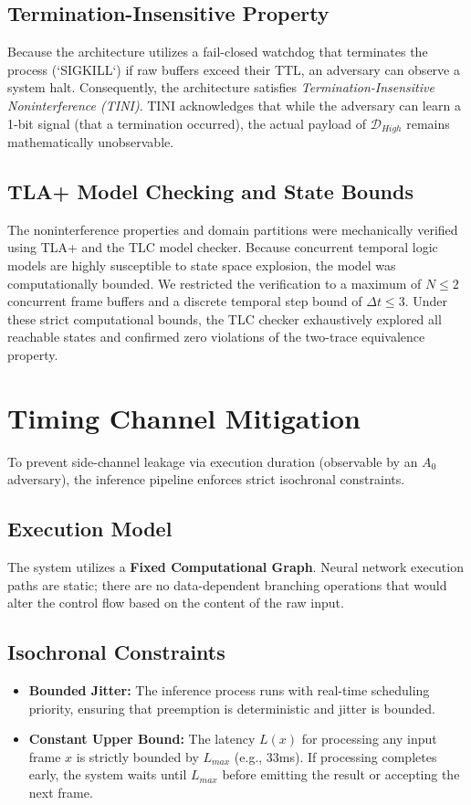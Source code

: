 \documentclass[conference]{IEEEtran}
\begin{document}
\subsection{Termination-Insensitive Property}
Because the architecture utilizes a fail-closed watchdog that terminates the process (`SIGKILL`) if raw buffers exceed their TTL, an adversary can observe a system halt. Consequently, the architecture satisfies \textit{Termination-Insensitive Noninterference (TINI)}. TINI acknowledges that while the adversary can learn a 1-bit signal (that a termination occurred), the actual payload of $\mathcal{D}_{High}$ remains mathematically unobservable.

\subsection{TLA+ Model Checking and State Bounds}
The noninterference properties and domain partitions were mechanically verified using TLA+ and the TLC model checker. Because concurrent temporal logic models are highly susceptible to state space explosion, the model was computationally bounded. We restricted the verification to a maximum of $N \le 2$ concurrent frame buffers and a discrete temporal step bound of $\Delta t \le 3$. Under these strict computational bounds, the TLC checker exhaustively explored all reachable states and confirmed zero violations of the two-trace equivalence property.

\section{Timing Channel Mitigation}
To prevent side-channel leakage via execution duration (observable by an $A_0$ adversary), the inference pipeline enforces strict isochronal constraints.

\subsection{Execution Model}
The system utilizes a \textbf{Fixed Computational Graph}. Neural network execution paths are static; there are no data-dependent branching operations that would alter the control flow based on the content of the raw input.

\subsection{Isochronal Constraints}
\begin{itemize}
    \item \textbf{Bounded Jitter:} The inference process runs with real-time scheduling priority, ensuring that preemption is deterministic and jitter is bounded.
    \item \textbf{Constant Upper Bound:} The latency $L(x)$ for processing any input frame $x$ is strictly bounded by $L_{max}$ (e.g., 33ms). If processing completes early, the system waits until $L_{max}$ before emitting the result or accepting the next frame.
\end{itemize}
\end{document}
